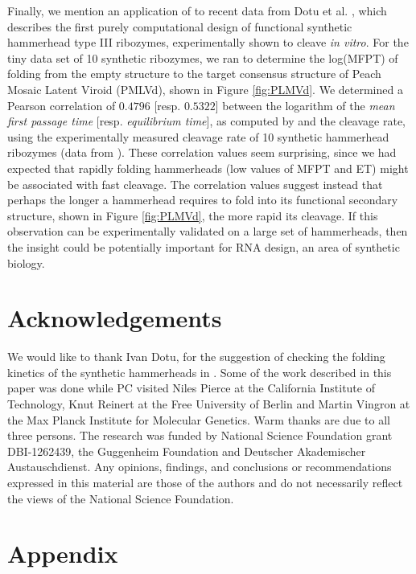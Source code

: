 Finally, we mention an application of \hermes to recent data from
Dotu et al. \cite{syntheticHammerheads}, which describes the
first purely computational design of functional synthetic hammerhead type III
ribozymes, experimentally shown to cleave {\em in vitro}. For the tiny
data set of 10 synthetic ribozymes, we ran \fftmfpt to determine the
log(MFPT) of folding from the empty structure to the target consensus
structure of Peach Mosaic Latent Viroid (PMLVd),
shown in Figure \ref{fig:PLMVd}. We determined a
Pearson correlation of $0.4796$ [resp. $0.5322$]  between the logarithm of the
{\em mean first passage time} [resp. {\em equilibrium time}], as computed by
 and the cleavage rate, using the
experimentally measured cleavage rate of 10 synthetic hammerhead ribozymes
(data from \cite{syntheticHammerheads}).
These correlation values seem surprising, since we had expected that
rapidly folding hammerheads (low values of MFPT and ET) might be
associated with fast cleavage. The correlation values suggest instead
that perhaps the longer a hammerhead requires to fold into its functional
secondary structure, shown in Figure \ref{fig:PLMVd}, the more rapid its
cleavage. If this observation can be experimentally validated on a large set
of hammerheads, then the insight could be potentially important for
RNA design, an area of synthetic biology.

\section{Acknowledgements}

We would like to thank Ivan Dotu, for the suggestion of checking the
folding kinetics of the synthetic hammerheads in \cite{syntheticHammerheads}.
Some of the work described in this paper was done while PC visited
Niles Pierce at the California Institute of Technology, Knut Reinert
at the Free University of Berlin and Martin Vingron at the Max Planck
Institute for Molecular Genetics. Warm thanks are due to all three
persons. The research was funded by National Science Foundation grant
DBI-1262439, the Guggenheim Foundation and Deutscher Akademischer
Austauschdienst. Any opinions, findings, and conclusions or
recommendations expressed in this material are those of the authors
and do not necessarily reflect the views of the National Science
Foundation.



\clearpage

\section*{Appendix}
\label{section:appendix}

